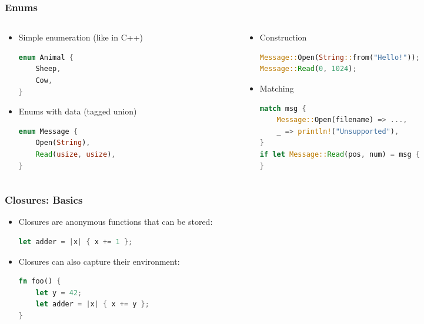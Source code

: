 \begin{frame}[fragile]
    \frametitle{Enums}

    \begin{columns}
    \begin{column}{0.5\textwidth}

    \begin{itemize}
        \item<1-> Simple enumeration (like in C++)
        \begin{lstlisting}[language=rust]
enum Animal {
    Sheep,
    Cow,
}
        \end{lstlisting}

        \item<2-> Enums with data (tagged union)
        \begin{lstlisting}[language=rust]
enum Message {
    Open(String),
    Read(usize, usize),
}
        \end{lstlisting}
    \end{itemize}

    \end{column}
    \begin{column}{0.5\textwidth}

    \begin{itemize}
        \item<3-> Construction
        \begin{lstlisting}[language=rust]
Message::Open(String::from("Hello!"));
Message::Read(0, 1024);
        \end{lstlisting}

        \item<4-> Matching
        \begin{lstlisting}[language=rust]
match msg {
    Message::Open(filename) => ...,
    _ => println!("Unsupported"),
}
if let Message::Read(pos, num) = msg {
}
        \end{lstlisting}
    \end{itemize}

    \end{column}
    \end{columns}
\end{frame}

\begin{frame}[fragile]
    \frametitle{Closures: Basics}

    \begin{itemize}
        \item<1-> Closures are anonymous functions that can be stored:
        \begin{lstlisting}[language=rust]
let adder = |x| { x += 1 };
        \end{lstlisting}

        \item<2-> Closures can also capture their environment:
        \begin{lstlisting}[language=rust]
fn foo() {
    let y = 42;
    let adder = |x| { x += y };
}
        \end{lstlisting}
    \end{itemize}
\end{frame}

